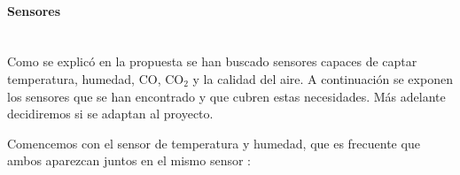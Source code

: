 \paragraph{Sensores}\mbox{} \\
Como se explicó en la propuesta se han buscado sensores capaces de captar temperatura, humedad, CO, CO$_2$ y la calidad del aire. A continuación se exponen los sensores que se han encontrado y que cubren estas necesidades. Más adelante decidiremos si se adaptan al proyecto.

Comencemos con el sensor de temperatura y humedad, que es frecuente que ambos aparezcan juntos en el mismo sensor \cite{noauthor_comparing_2019}:

\begin{table}[H]
	\centering
	\caption{Comparación sensores de temperatura y humedad}
	\label{tab:comp_temp}
\end{table}
